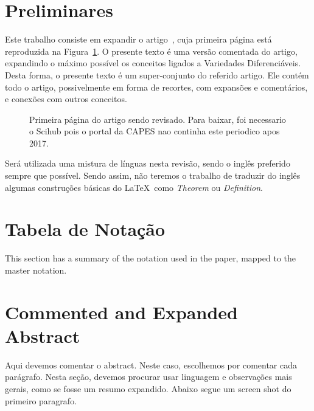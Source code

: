 \documentclass[a4paper,titlepage]{article}
\begin{document}


\section{Preliminares}

Este trabalho consiste em expandir o artigo~\cite{Pennec:AnnStat:2018},
cuja primeira página está reproduzida na Figura~\ref{fig:paper:page1}.
O presente texto é uma versão comentada do artigo,
expandindo o máximo possível os conceitos ligados a Variedades Diferenciáveis.
Desta forma, o presente texto é um super-conjunto do referido artigo.
Ele contém todo o artigo, possivelmente em forma de recortes, com expansões e
comentários, e conexões com outros conceitos.

\begin{figure}
\centering
{}
\caption{%
Primeira página do artigo sendo revisado. Para baixar, foi necessario o Scihub
pois o portal da CAPES nao continha este periodico apos 2017.
}\label{fig:paper:page1}
\end{figure}

Será utilizada uma mistura de línguas nesta revisão, sendo o inglês preferido
sempre que possível. Sendo assim, não teremos o trabalho de traduzir do inglês
algumas construções básicas do \LaTeX\ como \emph{Theorem} ou
\emph{Definition}.


\section{Tabela de Notação}

This section has a summary of the notation used in the paper, 
mapped to the master notation.

\section{Commented and Expanded Abstract}

Aqui devemos comentar o abstract. Neste caso, escolhemos por comentar
cada parágrafo. Nesta seção, devemos procurar usar linguagem e observações mais
gerais, como se fosse um resumo expandido. Abaixo segue um screen shot do primeiro paragrafo.

{
\vspace{1em}
\vspace{1em}
}
\end{document}

